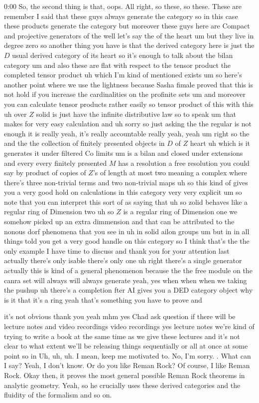 \begin{unfinished}{0:00}
So, the second thing is that, oops. All right, so these, so these. These are remember I said that these guys always generate the category so in this case these products generate the category but moreover these guys here are Compact and projective generators of the well let's say the of the heart um but they live in degree zero so another thing you have is that the derived category here is just the $D$ usual derived category of its heart so it's enough to talk about the bilan category um and also these are flat with respect to the tensor product the completed tensor product uh which I'm kind of mentioned exists um so here's another point where we use the lightness because Sasha fimale proved that this is not hold if you increase the cardinalities on the profinite sets um and moreover you can calculate tensor products rather easily so tensor product of this with this uh over $Z$ solid is just have the infinite distributive law so to speak um that makes for very easy calculation and uh sorry so just asking the the regular is not enough it is really yeah, it's really accountable really yeah, yeah um right so the and the the collection of finitely presented objects in $D$ of $Z$ heart uh which is it generates it under filtered Co limits um is a bilan and closed under extensions and every every finitely presented $M$ has a resolution a free resolution you could say by product of copies of $Z$'s of length at most two meaning a complex where there's three non-trivial terms and two non-trivial maps uh so this kind of gives you a very good hold on calculations in this category very very explicit um so note that you can interpret this sort of as saying that uh so zolid behaves like a regular ring of Dimension two uh so $Z$ is a regular ring of Dimension one we somehow picked up an extra dimmension and that can be attributed to the nonous dorf phenomena that you see in uh in solid ailon groups um but in in all things told you get a very good handle on this category so I think that's the the only example I have time to discuss and thank you for your attention last actually there's only isable there's only one uh right there's a single generator actually this is kind of a general phenomenon because the the free module on the canra set will always will always generate yeah, yes when when when we taking the pushup uh there's a completion fter AI gives you a DED category object why is it that it's a ring yeah that's something you have to prove and

 it's not obvious thank you yeah mhm yes Chad ask question if there will be lecture notes and video recordings video recordings yes lecture notes we're kind of trying to write a book at the same time as we give these lectures and it's not clear to what extent we'll be releasing things sequentially or all at once at some point so in
 Uh, uh, uh. I mean, keep me motivated to. No, I'm sorry. . What can I say? Yeah, I don't know. Or do you like Reman Rock? Of course, I like Reman Rock. Okay then, it proves the most general possible Reman Rock theorems in analytic geometry. Yeah, so he crucially uses these derived categories and the fluidity of the formalism and so on.


\end{unfinished}

